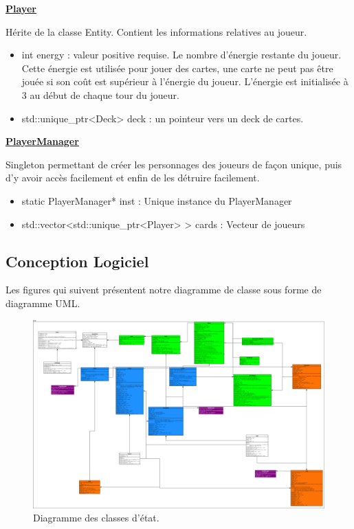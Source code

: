 \underline{\textbf{Player}}
\par Hérite de la classe Entity. Contient les informations relatives au joueur.
\begin{itemize}
    \item int energy : valeur positive requise. Le nombre d'énergie restante du joueur. Cette énergie est utilisée pour jouer des cartes, une carte ne peut pas être jouée si son coût est supérieur à l'énergie du joueur. L'énergie est initialisée à 3 au début de chaque tour du joueur.
    \item std::unique\_ptr<Deck>  deck : un pointeur vers un deck de cartes.
\end{itemize}

\underline{\textbf{PlayerManager}}
\par Singleton permettant de créer les personnages des joueurs de façon unique, puis d'y avoir accès facilement et enfin de les détruire facilement.
\begin{itemize}
    \item static PlayerManager* inst : Unique instance du PlayerManager
    \item std::vector<std::unique\_ptr<Player> > cards : Vecteur de joueurs
\end{itemize}

\subsection{Conception Logiciel}

Les figures qui suivent présentent notre diagramme de classe sous forme de diagramme UML.


\begin{landscape}
\begin{figure}[p]
\includegraphics[width=0.8\paperheight]{images/state.png}
\caption{\label{uml:state}Diagramme des classes d'état.} 
\end{figure}
\end{landscape}

